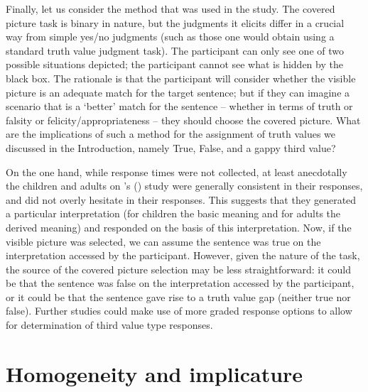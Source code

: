 \documentclass[12pt, letterpaper]{article}
\newcommand\posscite[1]{\citeauthor{#1}'s (\citeyear{#1})}
\begin{document}
Finally, let us consider the method that was used in the study. The covered picture task is binary in nature, but the judgments it elicits differ in a crucial way from simple yes/no judgments (such as those one would obtain using a standard truth value judgment task). The participant can only see one of two possible situations depicted; the participant cannot see what is hidden by the black box. The rationale is that the participant will consider whether the visible picture is an adequate match for the target sentence; but if they can imagine a scenario that is a `better' match for the sentence -- whether in terms of truth or falsity or felicity/appropriateness -- they should choose the covered picture. What are the implications of such a method for the assignment of truth values we discussed in the Introduction, namely True, False, and a gappy third value? 

On the one hand, while response times were not collected, at least anecdotally the children and adults on \posscite{Bill:2014b} study were generally consistent in their responses, and did not overly hesitate in their responses. This suggests that they generated a particular interpretation (for children the basic meaning and for adults the derived meaning) and responded on the basis of this interpretation. Now, if the visible picture was selected, we can assume the sentence was true on the interpretation accessed by the participant. However, given the nature of the task, the source of the covered picture selection may be less straightforward: it could be that the sentence was false on the interpretation accessed by the participant, or it could be that the sentence gave rise to a truth value gap (neither true nor false). Further studies could make use of more graded response options to allow for determination of third value type responses. 

\section{Homogeneity and implicature}
\end{document}
